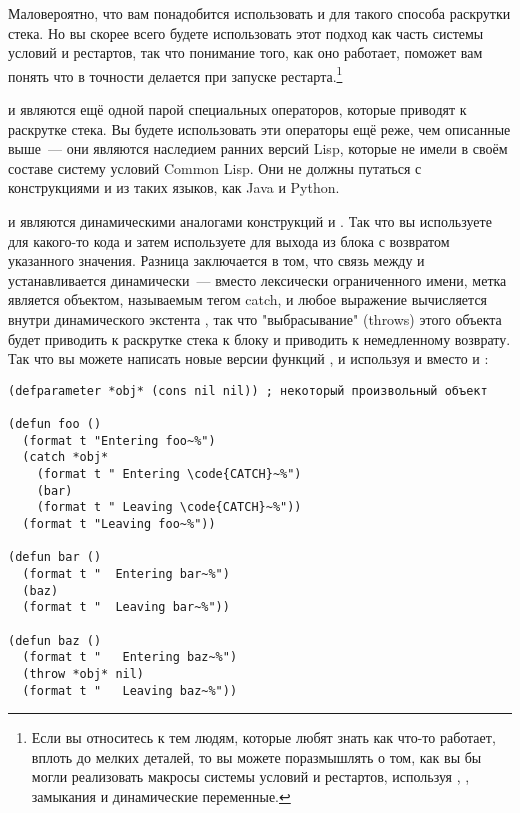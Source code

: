 Маловероятно, что вам понадобится использовать  и  для такого
способа раскрутки стека.  Но вы скорее всего будете использовать этот подход как часть
системы условий и рестартов, так что понимание того, как оно работает, поможет вам понять
что в точности делается при запуске рестарта.\footnote{Если вы относитесь к тем людям,
  которые любят знать как что-то работает, вплоть до мелких деталей, то вы можете
  поразмышлять о том, как вы бы могли реализовать макросы системы условий и рестартов,
  используя , , замыкания и динамические переменные.}

 и  являются ещё одной парой специальных операторов, которые
приводят к раскрутке стека.  Вы будете использовать эти операторы ещё реже, чем описанные
выше~--- они являются наследием ранних версий Lisp, которые не имели в своём составе
систему условий Common Lisp.  Они не должны путаться с конструкциями  и
 из таких языков, как Java и Python.

 и  являются динамическими аналогами конструкций  и
.  Так что вы используете  для какого-то кода и затем
используете  для выхода из блока  с возвратом указанного значения.
Разница заключается в том, что связь между  и  устанавливается
динамически~--- вместо лексически ограниченного имени, метка  является
объектом, называемым тегом catch, и любое выражение  вычисляется внутри
динамического экстента , так что "выбрасывание" (throws) этого объекта будет
приводить к раскрутке стека к блоку  и приводить к немедленному возврату.  Так
что вы можете написать новые версии функций ,  и  используя
 и  вместо  и :

\begin{lstlisting}
(defparameter *obj* (cons nil nil)) ; некоторый произвольный объект

(defun foo ()
  (format t "Entering foo~%")
  (catch *obj*
    (format t " Entering \code{CATCH}~%")
    (bar)
    (format t " Leaving \code{CATCH}~%"))
  (format t "Leaving foo~%"))

(defun bar ()
  (format t "  Entering bar~%")
  (baz)
  (format t "  Leaving bar~%"))

(defun baz ()
  (format t "   Entering baz~%")
  (throw *obj* nil)
  (format t "   Leaving baz~%"))
\end{lstlisting}

